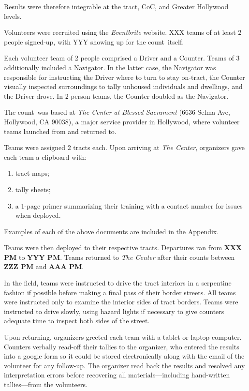 \documentclass[11pt]{article}
\def\bfr{\bf\color{red}}
\def\Count{count}
\begin{document}
Results were therefore integrable at the tract, CoC, and Greater Hollywood levels.

Volunteers were recruited using the {\it Eventbrite} website. XXX teams of at least
2 people signed-up, with YYY showing up for the \Count\ itself. 

Each volunteer team of 2 people comprised a Driver and a Counter. Teams of 3 additionally included
a Navigator. In the latter case, the Navigator was responsible for instructing the Driver where to turn
to stay on-tract, the Counter visually inspected surroundings to tally unhoused individuals and dwellings,
and the Driver drove. In 2-person teams, the Counter doubled as the Navigator. 

The \Count\ was based at {\it The Center at Blessed Sacrament} (6636 Selma Ave, Hollywood,
CA 90038), a major service provider in Hollywood, where volunteer teams launched from and returned
to.

Teams were assigned 2 tracts each. Upon arriving at {\it The Center}, organizers 
gave each team a clipboard with:
\begin{enumerate}
	\item tract maps;
	\item tally sheets;
	\item a 1-page primer summarizing their training with a contact number for issues when deployed.
\end{enumerate}
Examples of each of the above documents are included in the Appendix.

Teams were then deployed to their respective tracts. Departures ran from {\bfr XXX PM} 
to {\bfr YYY PM}. Teams returned to {\it The Center} after their counts between {\bfr ZZZ PM} and 
{\bfr AAA PM}.

In the field, teams were instructed to drive the tract interiors in a serpentine fashion if possible before
making a final pass of their border streets. All teams were instructed only to examine the interior sides
of tract borders. Teams were instructed to drive slowly, using hazard lights if necessary to give counters
adequate time to inspect both sides of the street.

Upon returning, organizers greeted each team with a tablet or laptop computer. Counters verbally 
read-off their tallies to the organizer, who entered the results into a google
form so it could be stored electronically along with the email of the volunteer for any follow-up. The 
organizer read back the results and resolved any interpretation errors before recovering all 
materials---including hand-written tallies---from the volunteers.
\end{document}
